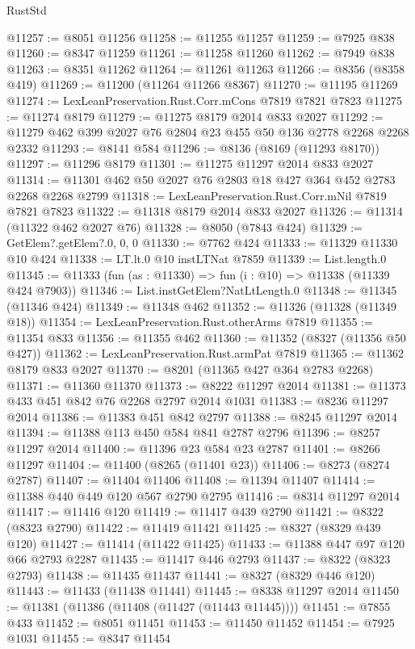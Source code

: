 \begin{lexlean}{RustStd}
\begin{coremodule}
{\begin{coremodule}
{{{{{{{{{{{{{{{{{{{{{{{{{{{{{{{{{{{{{{{{{{{{{{{{{{{{{{@11257 := @8051 @11256
@11258 := @11255 @11257
@11259 := @7925 @838
@11260 := @8347 @11259
@11261 := @11258 @11260
@11262 := @7949 @838
@11263 := @8351 @11262
@11264 := @11261 @11263
@11266 := @8356 (@8358 @419)
@11269 := @11200 (@11264 @11266 @8367)
@11270 := @11195 @11269
@11274 := LexLeanPreservation.Rust.Corr.mCons @7819 @7821 @7823
@11275 := @11274 @8179
@11279 := @11275 @8179 @2014 @833 @2027
@11292 := @11279 @462 @399 @2027 @76 @2804 @23 @455 @50 @136 @2778 @2268 @2268 @2332
@11293 := @8141 @584
@11296 := @8136 (@8169 (@11293 @8170))
@11297 := @11296 @8179
@11301 := @11275 @11297 @2014 @833 @2027
@11314 := @11301 @462 @50 @2027 @76 @2803 @18 @427 @364 @452 @2783 @2268 @2268 @2799
@11318 := LexLeanPreservation.Rust.Corr.mNil @7819 @7821 @7823
@11322 := @11318 @8179 @2014 @833 @2027
@11326 := @11314 (@11322 @462 @2027 @76)
@11328 := @8050 (@7843 @424)
@11329 := GetElem?.getElem?.{0, 0, 0}
@11330 := @7762 @424
@11333 := @11329 @11330 @10 @424
@11338 := LT.lt.{0} @10 instLTNat @7859
@11339 := List.length.{0}
@11345 := @11333 (fun (as : @11330) => fun (i : @10) => @11338 (@11339 @424 @7903))
@11346 := List.instGetElem?NatLtLength.{0}
@11348 := @11345 (@11346 @424)
@11349 := @11348 @462
@11352 := @11326 (@11328 (@11349 @18))
@11354 := LexLeanPreservation.Rust.otherArms @7819
@11355 := @11354 @833
@11356 := @11355 @462
@11360 := @11352 (@8327 (@11356 @50 @427))
@11362 := LexLeanPreservation.Rust.armPat @7819
@11365 := @11362 @8179 @833 @2027
@11370 := @8201 (@11365 @427 @364 @2783 @2268)
@11371 := @11360 @11370
@11373 := @8222 @11297 @2014
@11381 := @11373 @433 @451 @842 @76 @2268 @2797 @2014 @1031
@11383 := @8236 @11297 @2014
@11386 := @11383 @451 @842 @2797
@11388 := @8245 @11297 @2014
@11394 := @11388 @113 @450 @584 @841 @2787 @2796
@11396 := @8257 @11297 @2014
@11400 := @11396 @23 @584 @23 @2787
@11401 := @8266 @11297
@11404 := @11400 (@8265 (@11401 @23))
@11406 := @8273 (@8274 @2787)
@11407 := @11404 @11406
@11408 := @11394 @11407
@11414 := @11388 @440 @449 @120 @567 @2790 @2795
@11416 := @8314 @11297 @2014
@11417 := @11416 @120
@11419 := @11417 @439 @2790
@11421 := @8322 (@8323 @2790)
@11422 := @11419 @11421
@11425 := @8327 (@8329 @439 @120)
@11427 := @11414 (@11422 @11425)
@11433 := @11388 @447 @97 @120 @66 @2793 @2287
@11435 := @11417 @446 @2793
@11437 := @8322 (@8323 @2793)
@11438 := @11435 @11437
@11441 := @8327 (@8329 @446 @120)
@11443 := @11433 (@11438 @11441)
@11445 := @8338 @11297 @2014
@11450 := @11381 (@11386 (@11408 (@11427 (@11443 @11445))))
@11451 := @7855 @433
@11452 := @8051 @11451
@11453 := @11450 @11452
@11454 := @7925 @1031
@11455 := @8347 @11454
}}}}}}}}}}}}}}}}}}}}}}}}}}}}}}}}}}}}}}}}}}}}}}}}}}}}}}
\end{coremodule}}
\end{coremodule}
\end{lexlean}
